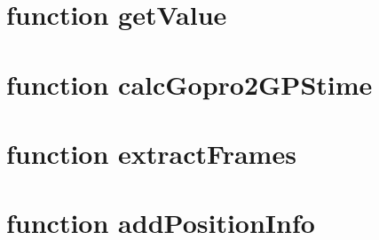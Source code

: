 \section{function getValue}
\label{sec:getValue}

\cleardoublepage
\section{function calcGopro2GPStime}
\label{sec:calcGopro2GPStime}

\cleardoublepage
\section{function extractFrames}
\label{sec:extractFrames}

\cleardoublepage
\section{function addPositionInfo}
\label{sec:addPositionInfo}
